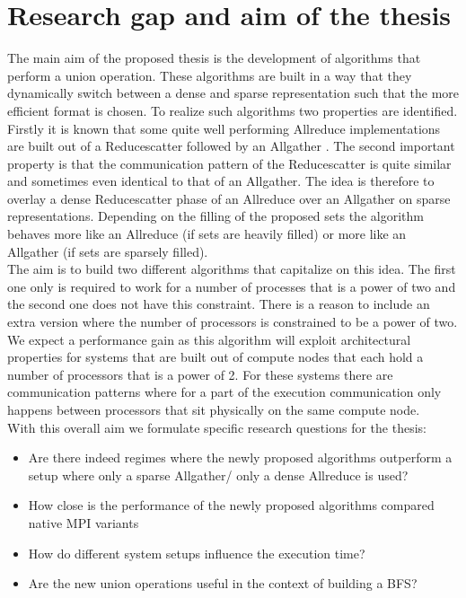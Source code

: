 \documentclass[a4paper,%
	12pt,%
	DIV14,
	headsepline,%
	headings=normal,
]{scrartcl}
\theoremstyle{definition}
\theoremstyle{remark}
\begin{document}
\section{Research gap and aim of the thesis}
The main aim of the proposed thesis is the development of algorithms that perform a union operation. These algorithms are built in a way that they dynamically switch between a dense and sparse representation such that the more efficient format is chosen. To realize such algorithms two properties are identified. Firstly it is known that some quite well performing Allreduce implementations are built out of a Reducescatter followed by an Allgather \cite{AllreduceSummaryAll}. The second important property is that the communication pattern of the Reducescatter is quite similar and sometimes even identical to that of an Allgather. The idea is therefore to overlay a dense Reducescatter phase of an Allreduce over an Allgather on sparse representations. Depending on the filling of the proposed sets the algorithm behaves more like an Allreduce (if sets are heavily filled) or more like an Allgather (if sets are sparsely filled).\\
The aim is to build two different algorithms that capitalize on this idea. The first one only is required to work for a number of processes that is a power of two and the second one does not have this constraint. There is a reason to include an extra version where the number of processors is constrained to be a power of two. We expect a performance gain as this algorithm will exploit architectural properties for systems that are built out of compute nodes that each hold a number of processors that is a power of 2. For these systems there are communication patterns where for a part of the execution communication only happens between processors that sit physically on the same compute node.\\
With this overall aim we formulate specific research questions for the thesis:
\begin{itemize}
	\item Are there indeed regimes where the newly proposed algorithms outperform a setup where only a sparse Allgather/ only a dense Allreduce is used?
	\item How close is the performance of the newly proposed algorithms compared native MPI variants
	\item How do different system setups influence the execution time? 
	\item Are the new union operations useful in the context of building a BFS? 
\end{itemize}
\end{document}

